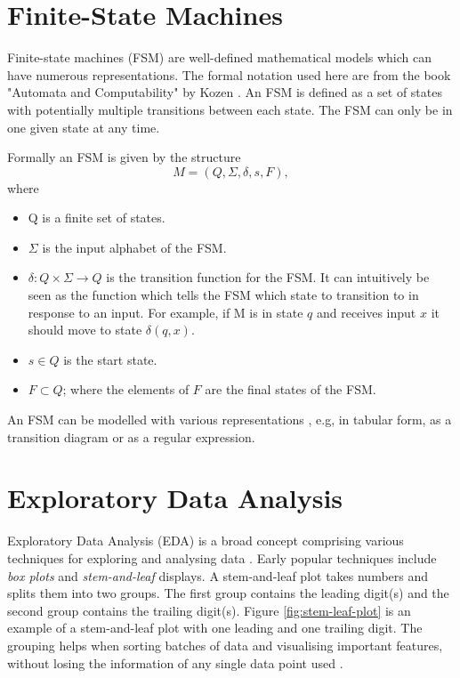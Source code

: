 \section{Finite-State Machines}
Finite-state machines (FSM) are well-defined mathematical models which can have numerous representations.
The formal notation used here are from the book "Automata and Computability" by Kozen \cite{Kozen1997}.
An FSM is defined as a set of states with potentially multiple transitions between each state.
The FSM can only be in one given state at any time.

Formally an FSM is given by the structure
\[M = (Q, \Sigma, \delta, s, F),\]
where
\begin{itemize}
    \item Q is a finite set of states.
    \item $\Sigma$ is the input alphabet of the FSM.
    \item $\delta : Q \times \Sigma \rightarrow Q$ is the transition function for the FSM.
    It can intuitively be seen as the function which tells the FSM which state to transition to in response to an input.
    For example, if M is in state $q$ and receives input $x$ it should move to state $\delta(q, x)$.
    \item $s \in Q$ is the start state.
    \item $F \subset Q$; where the elements of $F$ are the final states of the FSM.
\end{itemize}

An FSM can be modelled with various representations \cite{Kozen1997}, e.g, in tabular form, as a transition diagram or as a regular expression.

\section{Exploratory Data Analysis}
Exploratory Data Analysis (EDA) is a broad concept comprising various techniques for exploring and analysing data \cite{Anselin1999, Gelman2003, Hoaglin2003, Tukey1977, Velleman1981}.
Early popular techniques include \emph{box plots} and \emph{stem-and-leaf} displays.
A stem-and-leaf plot takes numbers and splits them into two groups.
The first group contains the leading digit(s) and the second group contains the trailing digit(s).
Figure \ref{fig:stem-leaf-plot} is an example of a stem-and-leaf plot with one leading and one trailing digit.
The grouping helps when sorting batches of data and visualising important features, without losing the information of any single data point used \cite{Velleman1981}.

